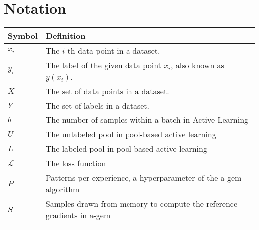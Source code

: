 \chapter*{Notation}
\label{ch:notation}


\begin{tabularx}{\textwidth}{l X}
    \toprule
    Symbol & Definition \\
    \midrule
    $x_i$ & The $i$-th data point in a dataset. \\ \addlinespace
    $y_i$ & The label of the given data point $x_i$, also known as $y(x_i)$. \\ \addlinespace
    $X$ & The set of data points in a dataset. \\ \addlinespace
    $Y$ & The set of labels in a dataset. \\ \addlinespace
    $b$ & The number of samples within a batch in Active Learning \\ \addlinespace
    $U$ & The unlabeled pool in pool-based active learning\\ \addlinespace
    $L$ & The labeled pool in pool-based active learning\\ \addlinespace
    $\mathcal{L}$ & The loss function \\ \addlinespace
    $P$ & Patterns per experience, a hyperparameter of the \gls{a-gem} algorithm \\ \addlinespace
    $S$ & Samples drawn from memory to compute the reference gradients in \gls{a-gem} \\ \addlinespace
    \bottomrule
\end{tabularx}
\label{tab:notation}